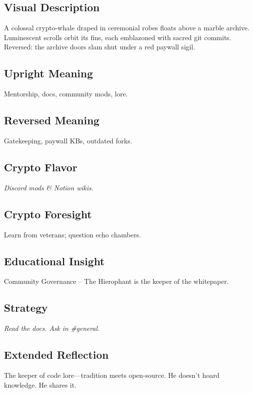 \documentclass[11pt,oneside]{book}
\begin{document}
\begin{minipage}[t]{0.55\textwidth}
  \vspace{0pt}

  \subsection*{Visual Description}
  A colossal crypto-whale draped in ceremonial robes floats above a marble archive. Luminescent scrolls orbit its fins, each emblazoned with sacred git commits. Reversed: the archive doors slam shut under a red paywall sigil.

  \subsection*{Upright Meaning}
  Mentorship, docs, community mods, lore.

  \subsection*{Reversed Meaning}
  Gatekeeping, paywall KBs, outdated forks.

  \subsection*{Crypto Flavor}
  \textit{Discord mods \& Notion wikis.}

  \subsection*{Crypto Foresight}
  Learn from veterans; question echo chambers.

  \subsection*{Educational Insight}
  Community Governance – The Hierophant is the keeper of the whitepaper.

  \subsection*{Strategy}
  \textit{Read the docs. Ask in \#general.}

  \subsection*{Extended Reflection}
  The keeper of code lore—tradition meets open-source. He doesn't hoard knowledge. He shares it.


\end{minipage}
\end{document}
